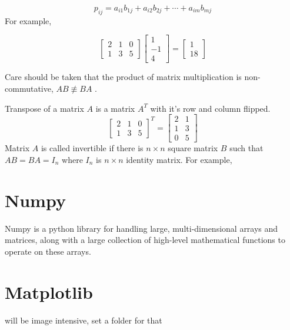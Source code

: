 \begin{equation}
	p_{ij}=a_{i1}b_{1j}+a_{i2}b_{2j}+\cdots+a_{im}b_{mj}
\end{equation}
\noindent For example,

\begin{equation}
	\begin{bmatrix}
		2&1  &0  \\
		1& 3 &5
	\end{bmatrix}
	\begin{bmatrix}
		1 \\
		-1 \\
		4
	\end{bmatrix}=
	\begin{bmatrix}
		1 \\
		18
	\end{bmatrix}
\end{equation}

\noindent Care should be taken that the product of matrix multiplication is non-commutative, $AB\not\equiv BA$ .

\noindent Transpose of a matrix $A$ is a matrix $A^T$ with it's row and column flipped.
\begin{equation}
\begin{bmatrix}
	2&1  &0  \\
	1& 3 &5 
\end{bmatrix}^T=
\begin{bmatrix}
	2& 1 \\
	1& 3 \\
	0&5
\end{bmatrix}
\end{equation}
\noindent Matrix $A$ is called invertible if there is $n\times n$ square matrix $B$ such that $AB=BA=I_n$ where $I_n$ is $n\times n$ identity matrix. For example,

\section{Numpy}
Numpy is a python library for handling large, multi-dimensional arrays and matrices, along with a large collection of high-level mathematical functions to operate on these arrays.
\section{Matplotlib}
will be image intensive, set a folder for that